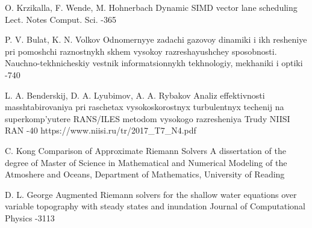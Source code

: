 \documentclass[utf8,english]{psta}%
\begin{document}
\begin{thebibliography}{30}
\by O. Krzikalla, F. Wende, M. Hohnerbach
\paper Dynamic SIMD vector lane scheduling
\jour Lect. Notes Comput. Sci.
-365

\by P. V. Bulat, K. N. Volkov
\paper Odnomernyye zadachi gazovoy dinamiki i ikh resheniye pri pomoshchi raznostnykh skhem vysokoy razreshayushchey sposobnosti.
\jour Nauchno-tekhnicheskiy vestnik informatsionnykh tekhnologiy, mekhaniki i optiki
-740

\by L. A. Benderskij, D. A. Lyubimov, A. A. Rybakov
\paper Analiz effektivnosti masshtabirovaniya pri raschetax vysokoskorostnyx turbulentnyx techenij na superkomp'yutere RANS/ILES metodom vysokogo razresheniya
\jour Trudy NIISI RAN
-40
\URL https://www.niisi.ru/tr/2017_T7_N4.pdf

\by C. Kong
\thesis Comparison of Approximate Riemann Solvers
\thesisinfo A dissertation of the degree of Master of Science in Mathematical and Numerical Modeling of the Atmoshere and Oceans, Department of Mathematics, University of Reading

\by D. L. George
\paper Augmented Riemann solvers for the shallow water equations over variable topography with steady states and inundation
\jour Journal of Computational Physics
-3113

\end{thebibliography}
\end{document}

